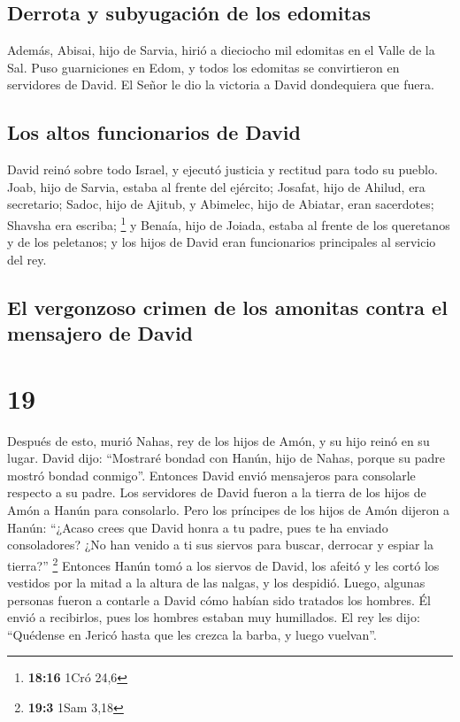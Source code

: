 \hypertarget{derrota-y-subyugaciuxf3n-de-los-edomitas}{%
\subsection{Derrota y subyugación de los
edomitas}\label{derrota-y-subyugaciuxf3n-de-los-edomitas}}

 Además, Abisai, hijo de Sarvia, hirió a dieciocho mil
edomitas en el Valle de la Sal.  Puso guarniciones en
Edom, y todos los edomitas se convirtieron en servidores de David. El
Señor le dio la victoria a David dondequiera que fuera.

\hypertarget{los-altos-funcionarios-de-david}{%
\subsection{Los altos funcionarios de
David}\label{los-altos-funcionarios-de-david}}

 David reinó sobre todo Israel, y ejecutó justicia y
rectitud para todo su pueblo.  Joab, hijo de Sarvia,
estaba al frente del ejército; Josafat, hijo de Ahilud, era secretario;
 Sadoc, hijo de Ajitub, y Abimelec, hijo de Abiatar, eran
sacerdotes; Shavsha era escriba; \footnote{\textbf{18:16} 1Cró 24,6}
 y Benaía, hijo de Joiada, estaba al frente de los
queretanos y de los peletanos; y los hijos de David eran funcionarios
principales al servicio del rey.

\hypertarget{el-vergonzoso-crimen-de-los-amonitas-contra-el-mensajero-de-david}{%
\subsection{El vergonzoso crimen de los amonitas contra el mensajero de
David}\label{el-vergonzoso-crimen-de-los-amonitas-contra-el-mensajero-de-david}}

\hypertarget{section-18}{%
\section{19}\label{section-18}}

 Después de esto, murió Nahas, rey de los hijos de Amón, y
su hijo reinó en su lugar.  David dijo: ``Mostraré bondad
con Hanún, hijo de Nahas, porque su padre mostró bondad conmigo''.
Entonces David envió mensajeros para consolarle respecto a su padre. Los
servidores de David fueron a la tierra de los hijos de Amón a Hanún para
consolarlo.  Pero los príncipes de los hijos de Amón
dijeron a Hanún: ``¿Acaso crees que David honra a tu padre, pues te ha
enviado consoladores? ¿No han venido a ti sus siervos para buscar,
derrocar y espiar la tierra?'' \footnote{\textbf{19:3} 1Sam 3,18}
 Entonces Hanún tomó a los siervos de David, los afeitó y
les cortó los vestidos por la mitad a la altura de las nalgas, y los
despidió.  Luego, algunas personas fueron a contarle a
David cómo habían sido tratados los hombres. Él envió a recibirlos, pues
los hombres estaban muy humillados. El rey les dijo: ``Quédense en
Jericó hasta que les crezca la barba, y luego vuelvan''.

